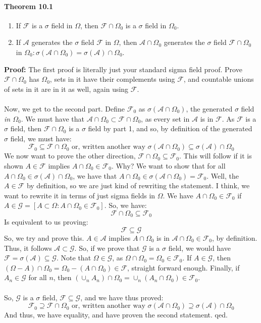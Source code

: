 \documentclass[12pt,a4paper]{article}
\newcommand{\1}[1]{\mathbbm{1}\left\{ #1 \right\}}
\newcommand{\acal}{\mathcal{A}}
\newcommand{\fcal}{\mathcal{F}}
\newcommand{\gcal}{\mathcal{G}}
\begin{document}
\paragraph{Theorem 10.1}
\begin{enumerate}
	\item If $\fcal$ is a $\sigma$ field in $\Omega$, then $\fcal \cap \Omega_0$ is a $\sigma$ field in $\Omega_0$.
	\item If $\acal$ generates the $\sigma$ field $\fcal$ in $\Omega$, then $\acal \cap \Omega_0$ generates the $\sigma$ field $\fcal \cap \Omega_0$ in $\Omega_0: \sigma(\acal \cap \Omega_0) = \sigma(\acal) \cap \Omega_0$.
\end{enumerate}
\textbf{Proof:} The first proof is literally just your standard sigma field proof. Prove $\fcal \cap \Omega_0$ has $\Omega_0$, sets in it have their complements using $\fcal$, and countable unions of sets in it are in it as well, again using $\fcal$.
\\\\
Now, we get to the second part. Define $\fcal_0$ as $\sigma(\acal \cap \Omega_0)$, the generated $\sigma$ field \textit{in $\Omega_0$}. We must have that $\acal \cap \Omega_0 \subset \fcal \cap \Omega_0$, as every set in $\acal$ is in $\fcal$. As $\fcal$ is a $\sigma$ field, then $\fcal \cap \Omega_0$ is a $\sigma$ field by part 1, and so, by definition of the generated $\sigma$ field, we must have:
$$
	\fcal_0 \subseteq \fcal \cap \Omega_0 \text{ or, written another way }
	\sigma(\acal \cap \Omega_0) \subseteq \sigma(\acal) \cap \Omega_0
$$
We now want to prove the other direction, $\fcal \cap \Omega_0 \subseteq \fcal_0$. This will follow if it is shown $A \in \fcal$ implies $A \cap \Omega_0 \in \fcal_0$. Why? We want to show that for all $A \cap \Omega_0 \in \sigma(\acal) \cap \Omega_0$, we have that $A \cap \Omega_0 \in \sigma(\acal \cap \Omega_0) = \fcal_0$. Well, the $A \in \fcal$ by definition, so we are just kind of rewriting the statement. I think, we want to rewrite it in terms of just sigma fields in $\Omega$. We have $A \cap \Omega_0 \in \fcal_0$ if $A \in \gcal = \left[A \subset \Omega: A \cap \Omega_0 \in \fcal_0\right]$. So, we have:
$$
	\fcal \cap \Omega_0 \subseteq \fcal_0
$$
Is equivalent to us proving:
$$
	\fcal \subseteq \gcal
$$
So, we try and prove this. $A \in \acal$ implies $A \cap \Omega_0$ is in $\acal \cap \Omega_0 \in \fcal_0$, by definition. Thus, it follows $\acal \subset \gcal$. So, if we prove that $\gcal$ is a $\sigma$ field, we would have $\fcal = \sigma(\acal) \subseteq \gcal$. Note that $\Omega \in \gcal$, as $\Omega \cap \Omega_0 = \Omega_0 \in \fcal_0$. If $A \in \gcal$, then $(\Omega - A) \cap \Omega_0 = \Omega_0 - (A \cap \Omega_0) \in \fcal$, straight forward enough. Finally, if $A_n \in \gcal$ for all $n$, then $(\cup_n A_n) \cap \Omega_0 = \cup_n (A_n \cap \Omega_0) \in \fcal_0$.
\\\\
So, $\gcal$ is a $\sigma$ field, $\fcal \subseteq \gcal$, and we have thus proved:
$$
	\fcal_0 \supseteq \fcal \cap \Omega_0 \text{ or, written another way }
	\sigma(\acal \cap \Omega_0) \supseteq \sigma(\acal) \cap \Omega_0
$$
And thus, we have equality, and have proven the second statement. qed.
\end{document}
